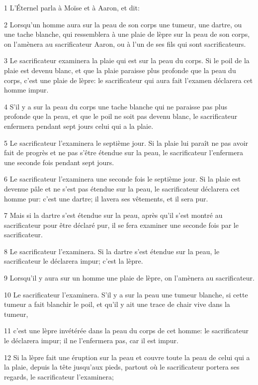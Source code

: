 \par 1 L'Éternel parla à Moïse et à Aaron, et dit:
\par 2 Lorsqu'un homme aura sur la peau de son corps une tumeur, une dartre, ou une tache blanche, qui ressemblera à une plaie de lèpre sur la peau de son corps, on l'amènera au sacrificateur Aaron, ou à l'un de ses fils qui sont sacrificateurs.
\par 3 Le sacrificateur examinera la plaie qui est sur la peau du corps. Si le poil de la plaie est devenu blanc, et que la plaie paraisse plus profonde que la peau du corps, c'est une plaie de lèpre: le sacrificateur qui aura fait l'examen déclarera cet homme impur.
\par 4 S'il y a sur la peau du corps une tache blanche qui ne paraisse pas plus profonde que la peau, et que le poil ne soit pas devenu blanc, le sacrificateur enfermera pendant sept jours celui qui a la plaie.
\par 5 Le sacrificateur l'examinera le septième jour. Si la plaie lui paraît ne pas avoir fait de progrès et ne pas s'être étendue sur la peau, le sacrificateur l'enfermera une seconde fois pendant sept jours.
\par 6 Le sacrificateur l'examinera une seconde fois le septième jour. Si la plaie est devenue pâle et ne s'est pas étendue sur la peau, le sacrificateur déclarera cet homme pur: c'est une dartre; il lavera ses vêtements, et il sera pur.
\par 7 Mais si la dartre s'est étendue sur la peau, après qu'il s'est montré au sacrificateur pour être déclaré pur, il se fera examiner une seconde fois par le sacrificateur.
\par 8 Le sacrificateur l'examinera. Si la dartre s'est étendue sur la peau, le sacrificateur le déclarera impur; c'est la lèpre.
\par 9 Lorsqu'il y aura sur un homme une plaie de lèpre, on l'amènera au sacrificateur.
\par 10 Le sacrificateur l'examinera. S'il y a sur la peau une tumeur blanche, si cette tumeur a fait blanchir le poil, et qu'il y ait une trace de chair vive dans la tumeur,
\par 11 c'est une lèpre invétérée dans la peau du corps de cet homme: le sacrificateur le déclarera impur; il ne l'enfermera pas, car il est impur.
\par 12 Si la lèpre fait une éruption sur la peau et couvre toute la peau de celui qui a la plaie, depuis la tête jusqu'aux pieds, partout où le sacrificateur portera ses regards, le sacrificateur l'examinera;

